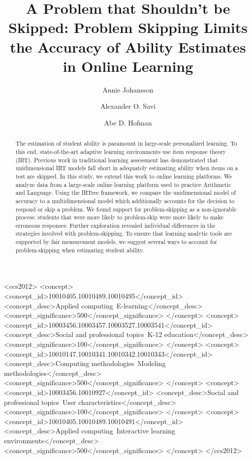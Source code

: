 \documentclass[anonymous,manuscript,review]{acmart}
\title[Accounting for Problem-skipping in Online Learning]{A Problem that Shouldn't be Skipped: Problem Skipping Limits the Accuracy of Ability Estimates in Online Learning}
\author{Annie Johansson}
\affiliation{%
  \institution{University of Amsterdam}
  \city{Amsterdam}
  \country{The Netherlands}
}
\author{Alexander O. Savi}
\affiliation{%
  \institution{University of Amsterdam}
  \city{Amsterdam}
  \country{The Netherlands}
}
\author{Abe D. Hofman}
\affiliation{%
  \institution{University of Amsterdam}
  \city{Amsterdam}
  \country{The Netherlands}
}
\affiliation{
  \institution{Prowise Learn}
  \city{Amsterdam}
  \country{The Netherlands}
}
\begin{document}
\begin{abstract}
    The estimation of student ability is paramount in large-scale personalized learning. To this end, state-of-the-art adaptive learning environments use item response theory (IRT). Previous work in traditional learning assessment has demonstrated that unidimensional IRT models fall short in adequately estimating ability when items on a test are skipped. In this study, we extend this work to online learning platforms. We analyze data from a large-scale online learning platform used to practice Arithmetic and Language. Using the IRTree framework, we compare the unidimensional model of accuracy to a multidimensional model which additionally accounts for the decision to respond or skip a problem. We found support for problem-skipping as a non-ignorable process: students that were more likely to problem-skip were more likely to make erroneous responses. Further exploration revealed individual differences in the strategies involved with problem-skipping. To ensure that learning analytic tools are supported by fair measurement models, we suggest several ways to account for problem-skipping when estimating student ability. 
\end{abstract}

\begin{CCSXML}
<ccs2012>
   <concept>
       <concept_id>10010405.10010489.10010495</concept_id>
       <concept_desc>Applied computing~E-learning</concept_desc>
       <concept_significance>500</concept_significance>
       </concept>
   <concept>
       <concept_id>10003456.10003457.10003527.10003541</concept_id>
       <concept_desc>Social and professional topics~K-12 education</concept_desc>
       <concept_significance>100</concept_significance>
       </concept>
   <concept>
       <concept_id>10010147.10010341.10010342.10010343</concept_id>
       <concept_desc>Computing methodologies~Modeling methodologies</concept_desc>
       <concept_significance>500</concept_significance>
       </concept>
   <concept>
       <concept_id>10003456.10010927</concept_id>
       <concept_desc>Social and professional topics~User characteristics</concept_desc>
       <concept_significance>100</concept_significance>
       </concept>
   <concept>
       <concept_id>10010405.10010489.10010491</concept_id>
       <concept_desc>Applied computing~Interactive learning environments</concept_desc>
       <concept_significance>500</concept_significance>
       </concept>
 </ccs2012>
\end{CCSXML}
\end{document}
